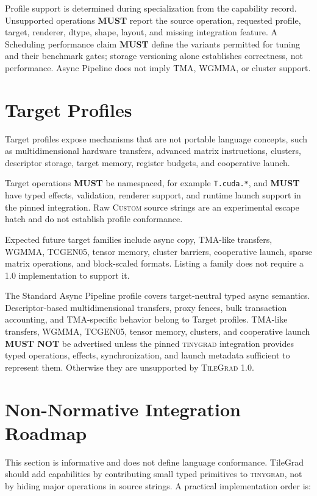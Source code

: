 \documentclass[10pt,letterpaper]{article}
\newcommand{\TileGrad}{\textsc{TileGrad}}
\newcommand{\tinygrad}{\textsc{tinygrad}}
\newcommand{\op}[1]{\textsc{#1}}
\newcommand{\must}{\textbf{MUST}}
\newcommand{\mustnot}{\textbf{MUST NOT}}
\begin{document}
Profile support is determined during specialization from the capability record.
Unsupported operations \must{} report the source operation, requested profile,
target, renderer, dtype, shape, layout, and missing integration feature. A
Scheduling performance claim \must{} define the variants permitted for tuning
and their benchmark gates; storage versioning alone establishes correctness,
not performance. Async Pipeline does not imply TMA, WGMMA, or cluster support.

\section*{Target Profiles}

Target profiles expose mechanisms that are not portable language concepts,
such as multidimensional hardware transfers, advanced matrix instructions,
clusters, descriptor storage, target memory, register budgets, and cooperative
launch.

Target operations \must{} be namespaced, for example \texttt{T.cuda.*}, and
\must{} have typed effects, validation, renderer support, and runtime launch
support in the pinned integration. Raw \op{Custom} source strings are an
experimental escape hatch and do not establish profile conformance.

Expected future target families include async copy, TMA-like transfers, WGMMA,
TCGEN05, tensor memory, cluster barriers, cooperative launch, sparse matrix
operations, and block-scaled formats. Listing a family does not require a 1.0
implementation to support it.

The Standard Async Pipeline profile covers target-neutral typed async
semantics. Descriptor-based multidimensional transfers, proxy fences, bulk
transaction accounting, and TMA-specific behavior belong to Target profiles.
TMA-like transfers, WGMMA, TCGEN05, tensor memory, clusters, and cooperative
launch \mustnot{} be advertised unless the pinned \tinygrad{} integration
provides typed operations, effects, synchronization, and launch metadata
sufficient to represent them. Otherwise they are unsupported by \TileGrad{}
1.0.

\section*{Non-Normative Integration Roadmap}

This section is informative and does not define language conformance. TileGrad
should add capabilities by contributing small typed primitives to \tinygrad{},
not by hiding major operations in source strings. A practical implementation
order is:
\end{document}
